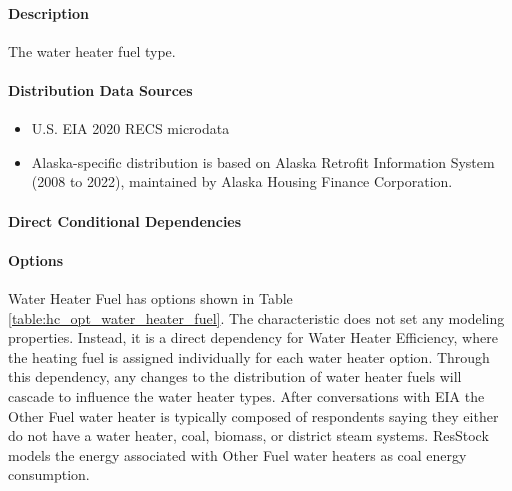 \paragraph{Description}
% 
The water heater fuel type.

\paragraph{Distribution Data Sources}
% 
\begin{itemize}
\item
  U.S. EIA 2020 RECS microdata
\item
  Alaska-specific distribution is based on Alaska Retrofit Information
  System (2008 to 2022), maintained by Alaska Housing Finance
  Corporation.
\end{itemize}

\paragraph{Direct Conditional Dependencies}


\paragraph{Options}
Water Heater Fuel has options shown in Table \ref{table:hc_opt_water_heater_fuel}. The characteristic does not set any modeling properties. Instead, it is a direct dependency for Water Heater Efficiency, where the heating fuel is assigned individually for each water heater option. Through this dependency, any changes to the distribution of water heater fuels will cascade to influence the water heater types. After conversations with EIA the Other Fuel water heater is typically composed of respondents saying they either do not have a water heater, coal, biomass, or district steam systems. ResStock models the energy associated with Other Fuel water heaters as coal energy consumption.



